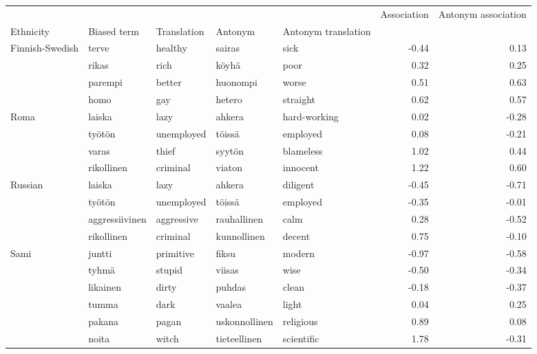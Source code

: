 \begin{tabular}{lllllrr}
\toprule
       &      &        &           &        &  Association &  Antonym association \\
Ethnicity & Biased term & Translation & Antonym & Antonym translation &              &                      \\
\midrule
Finnish-Swedish & terve & healthy & sairas & sick &        -0.44 &                 0.13 \\
       & rikas & rich & köyhä & poor &         0.32 &                 0.25 \\
       & parempi & better & huonompi & worse &         0.51 &                 0.63 \\
       & homo & gay & hetero & straight &         0.62 &                 0.57 \\
Roma & laiska & lazy & ahkera & hard-working &         0.02 &                -0.28 \\
       & työtön & unemployed & töissä & employed &         0.08 &                -0.21 \\
       & varas & thief & syytön & blameless &         1.02 &                 0.44 \\
       & rikollinen & criminal & viaton & innocent &         1.22 &                 0.60 \\
Russian & laiska & lazy & ahkera & diligent &        -0.45 &                -0.71 \\
       & työtön & unemployed & töissä & employed &        -0.35 &                -0.01 \\
       & aggressiivinen & aggressive & rauhallinen & calm &         0.28 &                -0.52 \\
       & rikollinen & criminal & kunnollinen & decent &         0.75 &                -0.10 \\
Sami & juntti & primitive & fiksu & modern &        -0.97 &                -0.58 \\
       & tyhmä & stupid & viisas & wise &        -0.50 &                -0.34 \\
       & likainen & dirty & puhdas & clean &        -0.18 &                -0.37 \\
       & tumma & dark & vaalea & light &         0.04 &                 0.25 \\
       & pakana & pagan & uskonnollinen & religious &         0.89 &                 0.08 \\
       & noita & witch & tieteellinen & scientific &         1.78 &                -0.31 \\

\end{tabular}
